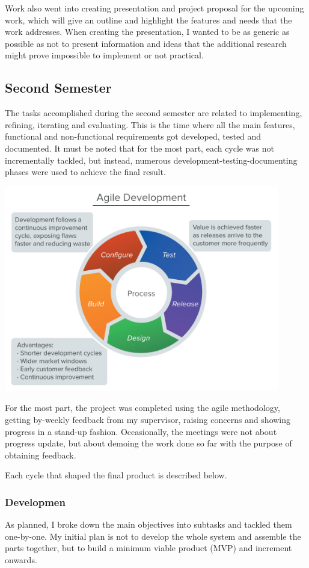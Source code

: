 \documentclass{article}
\begin{document}
Work also went into creating presentation and project proposal for the upcoming work, which will give an outline and highlight the features and needs that the work addresses.
When creating the presentation, I wanted to be as generic as possible as not to present information and ideas that the additional research might prove impossible to implement or not practical.

\subsection{Second Semester}

The tasks accomplished during the second semester are related to implementing, refining, iterating and evaluating. This is the time where all the main features, functional and non-functional requirements got developed, tested and documented. It must be noted that for the most part, each cycle was not incrementally tackled, but instead, numerous development-testing-documenting phases were used to achieve the final result.
\begin{center}
	\includegraphics[width=12cm]{agile.jpg}
\end{center}


For the most part, the project was completed using the agile methodology, getting by-weekly feedback from my supervisor, raising concerns and showing progress in a stand-up fashion. Occasionally, the meetings were not about progress update, but about demoing the work done so far with the purpose of obtaining feedback.

Each cycle that shaped the final product is described below.
\subsubsection{Developmen}
As planned, I broke down the main objectives into subtasks and tackled them one-by-one. My initial plan is not to develop the whole system and assemble the parts together, but to build a minimum viable product (MVP) and increment onwards.
\end{document}
